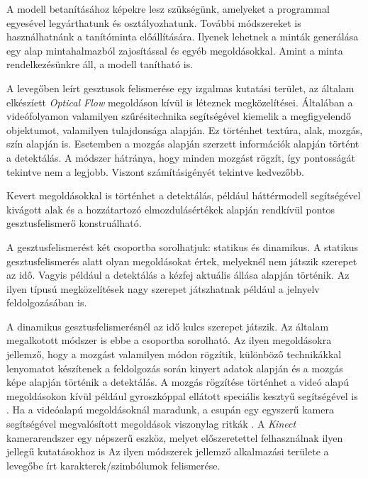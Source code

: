 A modell betanításához képekre lesz szükségünk, amelyeket a programmal egyesével legyárthatunk és osztályozhatunk. További módszereket is használhatnánk a tanítóminta előállítására. Ilyenek lehetnek a minták generálása egy alap mintahalmazból zajosítással és egyéb megoldásokkal. Amint a minta rendelkezésünkre áll, a modell tanítható is.

A levegőben leírt gesztusok felismerése egy izgalmas kutatási terület, az általam elkészíett \textit{Optical Flow} megoldáson kívül is léteznek megközelítései. Általában a videófolyamon valamilyen szűrésitechnika segítségével kiemelik a megfigyelendő objektumot, valamilyen tulajdonsága alapján. Ez történhet textúra, alak, mozgás, szín alapján is. \cite{fadhil2018trackingsurvey} Esetemben a mozgás alapján szerzett információk alapján történt a detektálás. A módszer hátránya, hogy minden mozgást rögzít, így pontosságát tekintve nem a legjobb. Viszont számításigényét tekintve kedvezőbb.

Kevert megoldásokkal is történhet a detektálás, például háttérmodell segítségével kivágott alak és a hozzátartozó elmozdulásértékek alapján rendkívül pontos gesztusfelismerő konstruálható. \cite{lin2009recognizing}

A gesztusfelismerést két csoportba sorolhatjuk: statikus és dinamikus. A statikus gesztusfelismerés alatt olyan megoldásokat értek, melyeknél nem játszik szerepet az idő. Vagyis például a detektálás a kézfej aktuális állása alapján történik. \cite{purohit2018precisehand} \cite{robust2017mouse} \cite{kumar2019calculator} Az ilyen típusú megközelítések nagy szerepet játszhatnak például a jelnyelv feldolgozásában is.

A dinamikus gesztusfelismerésnél az idő kulcs szerepet játszik. Az általam megalkotott módszer is ebbe a csoportba sorolható. Az ilyen megoldásokra jellemző, hogy a mozgást valamilyen módon rögzítik, különböző technikákkal lenyomatot készítenek a feldolgozás során kinyert adatok alapján és a mozgás képe alapján történik a detektálás. A mozgás rögzítése történhet a videó alapú megoldásokon kívül például gyroszkóppal ellátott speciális kesztyű segítségével is \cite{ponraj2012wireless}. Ha a videóalapú megoldásoknál maradunk, a csupán egy egyszerű kamera segítségével megvalósított megoldások viszonylag ritkák \cite{joseph2018visual}. A \textit{Kinect} kamerarendszer egy népszerű eszköz, melyet előszeretettel felhasználnak ilyen jellegű kutatásokhoz is \cite{zhang2013new} \cite{tang2018structured}
Az ilyen módszerek jellemző alkalmazási területe a levegőbe írt karakterek/szimbólumok felismerése.
